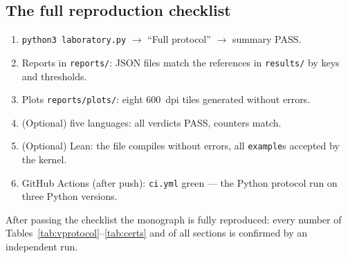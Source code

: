 \subsection{The full reproduction checklist}

\begin{enumerate}[leftmargin=2em, itemsep=0.15em]
\item \texttt{python3 laboratory.py} $\to$ ``Full protocol'' $\to$
  summary PASS.
\item Reports in \texttt{reports/}: JSON files match the references
  in \texttt{results/} by keys and thresholds.
\item Plots \texttt{reports/plots/}: eight $600$~dpi tiles generated
  without errors.
\item (Optional) five languages: all verdicts PASS, counters match.
\item (Optional) Lean: the file compiles without errors, all
  \texttt{example}s accepted by the kernel.
\item GitHub Actions (after push): \texttt{ci.yml} green --- the
  Python protocol run on three Python versions.
\end{enumerate}

After passing the checklist the monograph is fully reproduced: every
number of Tables~\ref{tab:vprotocol}--\ref{tab:certs} and of all
sections is confirmed by an independent run.

